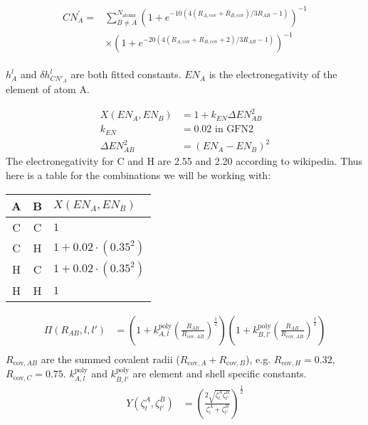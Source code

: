 \documentclass{article}
\begin{document}
\begin{align}
\begin{split}
  CN^{'}_A = &\sum^{N_\text{atoms}}_{B \neq A} (1 + e^{-10(4(R_{A,\text{cov}} + R_{B,\text{cov}})/3R_{AB}-1)})^{-1} \\
             &\times (1 + e^{-20(4(R_{A,\text{cov}} + R_{B,\text{cov}} + 2)/3R_{AB}-1)})^{-1}
\end{split}
\end{align}

$h^l_A$ and $\delta h^l_{CN'_A}$ are both fitted constants. $EN_A$ is the electronegativity of the element of atom A. 

\begin{align}
    X(EN_A,EN_B) &= 1 + k_{EN}\Delta EN_{AB}^2\\
    k_{EN} &= 0.02 \text{ in GFN2}\\
    \Delta EN_{AB}^2 &= (EN_A-EN_B)^2  
\end{align}
The electronegativity for C and H are 2.55 and 2.20 according to wikipedia.
Thus here is a table for the combinations we will be working with:\\ 
\begin{tabular}{c|c|l}
    A&B&$X(EN_A,EN_B)$\\
    \hline
    C&C&$1$\\
    C&H&$1+0.02\cdot (0.35^2)$\\
    H&C&$1+0.02\cdot (0.35^2)$\\
    H&H&$1$\\
\end{tabular}
\begin{equation}
\begin{split}
    \Pi(R_{AB},l,l') &= \left(1 + k^{\text{poly}}_{A,l}\left(\frac{R_{AB}}{R_{\text{cov},AB}}\right)^\frac{1}{2}\right)\left(1 + k^{\text{poly}}_{B,l'}\left(\frac{R_{AB}}{R_{\text{cov},AB}}\right)^\frac{1}{2}\right)\\
\end{split}
\end{equation}
$R_{\text{cov},AB}$ are the summed covalent radii (\(R_{\text{cov},A} + R_{\text{cov},B}\)), e.g. $R_{\text{cov},H}=0.32$, $R_{\text{cov},C}=0.75$. $k^{\text{poly}}_{A,l}$ and $k^{\text{poly}}_{B,l'}$ are element and shell specific constants. 
\begin{equation}
\begin{split}
    Y(\zeta^A_l,\zeta^B_{l'}) &= \left(\frac{2\sqrt{\zeta^A_l\zeta^B_{l'}}}{\zeta^A_l+\zeta^B_{l'}}\right)^\frac{1}{2}\\
\end{split}
\end{equation}
\end{document}

